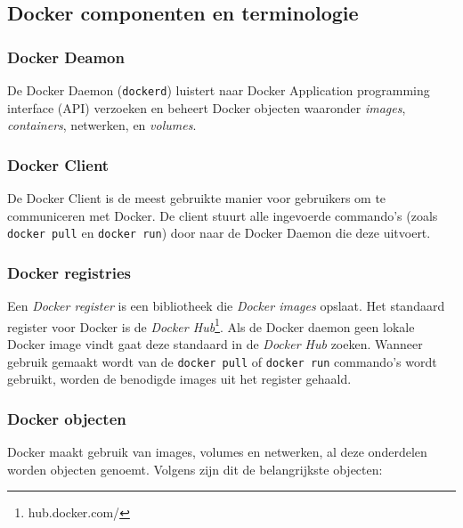 \subsection{Docker componenten en terminologie}

\subsubsection{Docker Deamon}De Docker Daemon (\verb|dockerd|) luistert naar Docker Application programming interface (API) verzoeken en beheert Docker objecten waaronder \textit{images}, \textit{containers}, netwerken, en \textit{volumes}.

\subsubsection{Docker Client}De Docker Client is de meest gebruikte manier voor gebruikers om te communiceren met Docker. De client stuurt alle ingevoerde commando's (zoals \verb|docker pull| en \verb|docker run|) door naar de Docker Daemon die deze uitvoert.

\subsubsection{Docker registries} \label{registry}
Een \textit{Docker register} is een bibliotheek die \textit{Docker images} opslaat. Het standaard register voor Docker is de \textit{Docker Hub}\footnote{hub.docker.com/}. Als de Docker daemon geen lokale Docker image vindt gaat deze standaard in de \textit{Docker Hub} zoeken. Wanneer gebruik gemaakt wordt van de \verb|docker pull| of \verb|docker run| commando's wordt gebruikt, worden de benodigde images uit het register gehaald.

\subsubsection{Docker objecten} \label{dockerObjects}
Docker maakt gebruik van images, volumes en netwerken, al deze onderdelen worden objecten genoemt. Volgens \textcite{Docker2021a} zijn dit de belangrijkste objecten:

